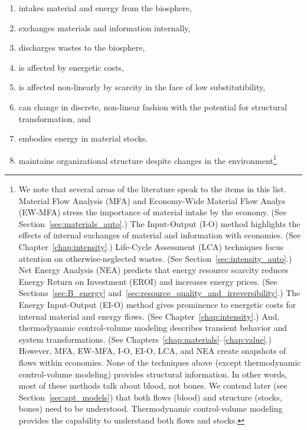 \begin{enumerate}
	\item{intakes material and energy from the biosphere,}
	\item{exchanges materials and information internally,}
	\item{discharges wastes to the biosphere,}
	\item{is affected by energetic costs,}
	\item{is affected non-linearly by scarcity in the face of low substitutibility,}
	\item{can change in discrete, non-linear fashion with the potential 
			for structural transformation, and}
	\item{embodies energy in material stocks.}
	\item{maintains organizational structure despite changes in the environment\footnote{We note that 
			several areas of the literature speak to the items in this list.
			Material Flow Analysis (MFA) and 
			Economy-Wide Material Flow Analys (EW-MFA)
			stress the importance of
			material intake by the economy. 
			(See Section~\ref{sec:materials_auto}.)
			The Input-Output (I-O) method highlights the effects of internal exchanges
			of material and information with economies. 
			(See Chapter~\ref{chap:intensity}.)
			Life-Cycle Assessment (LCA) techniques focus attention 
			on otherwise-neglected wastes. 
			(See Section~\ref{sec:intensity_auto}.)
			Net Energy Analysis (NEA) predicts that energy resource 
			scarcity reduces Energy Return on Investment (EROI)
			and increases energy prices.
			(See Sections~\ref{sec:B_energy} 
			and~\ref{sec:resource_quality_and_irreversibility}.)
			The Energy Input-Output (EI-O) method gives prominence to energetic costs
			for internal material and energy flows.
			(See Chapter~\ref{chap:intensity}.)
			And, thermodynamic control-volume modeling describes
			transient behavior and system transformations.
			(See Chapters~\ref{chap:materials}--\ref{chap:value}.)
			However, MFA, EW-MFA, I-O, EI-O, LCA, and NEA create snapshots 
			of flows within economies. 
			None of the techniques above (except thermodynamic control-volume modeling) 
			provides structural information. 
			In other words, most of these methods talk about blood, not bones. 
			We contend later (see Section~\ref{sec:apt_models}) that both flows (blood) 
			and structure (stocks, bones) need to be understood.
			Thermodynamic control-volume modeling provides the capability 
			to understand both flows and stocks.}}
\end{enumerate}

